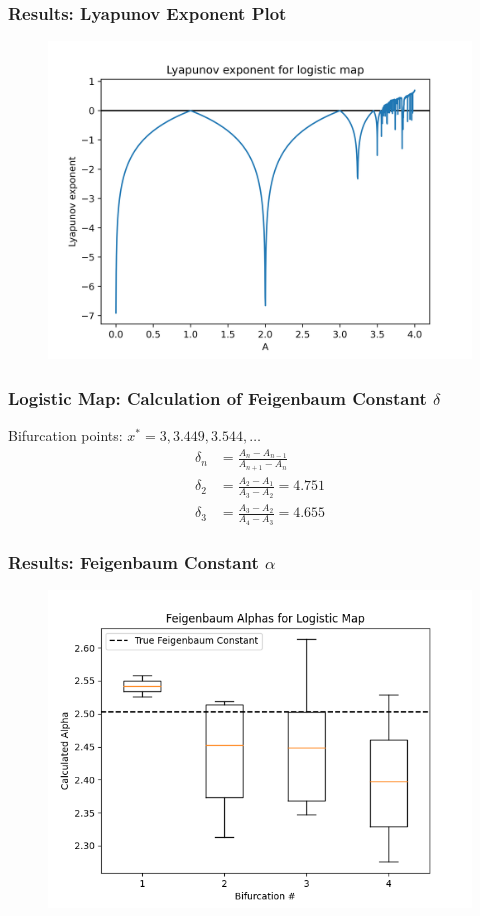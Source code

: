 \documentclass[
	11pt, %
	aspectratio=169, %
]{beamer}
\begin{document}

\begin{frame}
        \frametitle{Results: Lyapunov Exponent Plot}
    \begin{figure}
        \includegraphics[width=0.6\linewidth]{logistic_lyapunov_exp.png}
    \end{figure}
\end{frame}


\begin{frame}
        \frametitle{Logistic Map: Calculation of Feigenbaum Constant $\delta$}
        Bifurcation points: $x^* = 3, 3.449, 3.544, \dots$ \pause
        \begin{align*}
            \delta_{n} &= \frac{A_{n}-A_{n-1}}{A_{n+1}-A_{n}} \\
            \delta_{2} &= \frac{A_{2}-A_{1}}{A_{3}-A_{2}} = 4.751 \\
            \delta_{3} &= \frac{A_{3}-A_{2}}{A_{4}-A_{3}} = 4.655
        \end{align*}
\end{frame}


\begin{frame}
        \frametitle{Results: Feigenbaum Constant $\alpha$}
    \begin{figure}
        \includegraphics[width=0.6\linewidth]
        {logistic_feigenbaum_alphas.png}
    \end{figure}
\end{frame}
\end{document}

